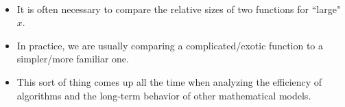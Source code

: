 \setcounter{chapter}{7}
\setcounter{section}{8}
\setcounter{theorem}{0}
\setcounter{equation}{0}


\begin{remark}\,
\begin{itemize}
\item It is often necessary to compare the relative sizes of two functions for ``large" $x$.
\item In practice, we are usually comparing a complicated/exotic function to a simpler/more familiar one.
\item This sort of thing comes up all the time when analyzing the efficiency of algorithms and the long-term behavior of other mathematical models.
\end{itemize}
\end{remark}

